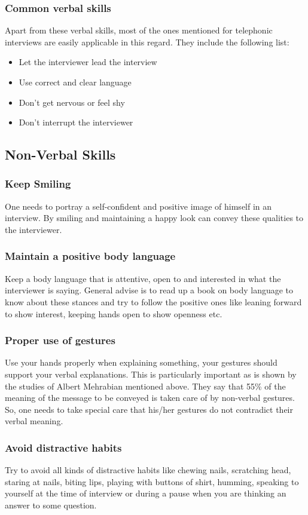 \documentclass[a4paper,12pt]{report}
\begin{document}
\subsubsection{Common verbal skills}
Apart from these verbal skills, most of the ones mentioned for telephonic interviews are easily applicable in
this regard. They include the following list:
\begin{itemize}
 \item Let the interviewer lead the interview
 \item Use correct and clear language
 \item Don’t get nervous or feel shy
 \item Don't interrupt the interviewer
\end{itemize}

\subsection{Non-Verbal Skills}
\subsubsection{Keep Smiling}
One needs to portray a self-confident and positive image of himself in an interview. By smiling and maintaining
a happy look can convey these qualities to the interviewer.
\subsubsection{Maintain a positive body language}
Keep a body language that is attentive, open to and interested in what the interviewer is saying. General advise is to
read up a book on body language to know about these stances and try to follow the positive ones like leaning 
forward to show interest, keeping hands open to show openness etc.
\subsubsection{Proper use of gestures}
Use your hands properly when explaining something, your gestures should support your verbal explanations.
This is particularly important as is shown by the studies of Albert Mehrabian\cite{mehrabian} mentioned above. They say that 
55\% of the meaning of the message to be conveyed is taken care of by non-verbal gestures. So, one needs to
take special care that his/her gestures do not contradict their verbal meaning.
\subsubsection{Avoid distractive habits}
Try to avoid all kinds of distractive habits like chewing nails, scratching head, staring at nails, biting lips,
playing with buttons of shirt, humming, speaking to yourself at the time of interview or during a pause when you 
are thinking an answer to some question.
\end{document}
